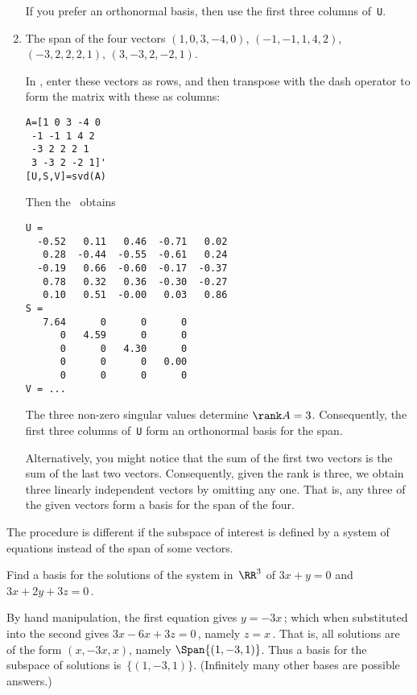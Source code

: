 \begin{example}
\begin{enumerate}
\begin{solution}
If you prefer an orthonormal basis, then use the first three columns of~\verb|U|. 
\end{solution}



\item The span of the four vectors
\((1,0,3,-4,0)\), 
\((-1,-1,1,4,2)\), 
\((-3,2,2,2,1)\), 
\((3,-3,2,-2,1)\).
\begin{solution} 
In \script, enter these vectors as rows, and then transpose with the dash operator to form the matrix with these as columns:
\begin{verbatim}
A=[1 0 3 -4 0
 -1 -1 1 4 2
 -3 2 2 2 1
 3 -3 2 -2 1]'
[U,S,V]=svd(A)
\end{verbatim}
\setbox\ajrqrbox\hbox{}%
\marginpar{\usebox{\ajrqrbox}}%
Then the \svd\ obtains \twodp
\begin{verbatim}
U =
  -0.52   0.11   0.46  -0.71   0.02
   0.28  -0.44  -0.55  -0.61   0.24
  -0.19   0.66  -0.60  -0.17  -0.37
   0.78   0.32   0.36  -0.30  -0.27
   0.10   0.51  -0.00   0.03   0.86
S =
   7.64      0      0      0
      0   4.59      0      0
      0      0   4.30      0
      0      0      0   0.00
      0      0      0      0
V = ...
\end{verbatim}
The three non-zero singular values determine  \(\rank A=3\).
Consequently, the first three columns of~\verb|U| form an orthonormal basis for the span. 

Alternatively, you might notice that the sum of the first two vectors is the sum of the last two vectors.
Consequently, given the rank is three, we obtain three linearly independent vectors by omitting any one.
That is, any three of the given vectors form a basis for the span of the four.
\end{solution}

\end{enumerate}
\end{example}


The procedure is different if the subspace of interest is defined by a system of equations instead of the span of some vectors.

\begin{example} \label{eg:bas2sys}
Find a basis for the solutions of the system in~\(\RR^3\) of \(3x+y=0\) and \(3x+2y+3z=0\)\,.
\begin{solution} 
By hand manipulation, the first equation gives \(y=-3x\)\,; which when substituted into the second gives \(3x-6x+3z=0\)\,, namely \(z=x\)\,.  
That is, all solutions are of the form \((x,-3x,x)\), namely \(\Span\{(1,-3,1)\}\).
Thus a basis for the subspace of solutions is~\(\{(1,-3,1)\}\).
(Infinitely many other bases are possible answers.)
\end{solution}
\end{example}




